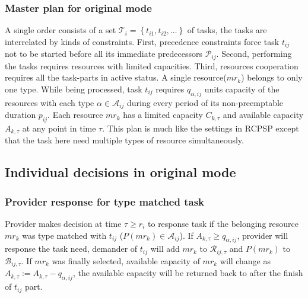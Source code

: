 \subsubsection{Master plan for original mode} %
\label{ssub:master_plam}
A single order consists of a set $\mathcal{T}_i = \left\{ t_{i1},t_{i2},\dots\right\}$ of tasks, the tasks are interrelated by kinds of constraints. First, precedence constraints force task $t_{ij}$ not to be started before all its immediate predecessors $\mathcal{P}_{ij}$. Second, performing the tasks requires resources with limited capacities. Third, resources cooperation requires all the task-parts in active status.
A single resource($mr_k$) belongs to only one type. While being processed, task $t_{ij}$ requires $q_{\alpha,ij}$ units capacity of the resources with each type $\alpha\in\mathcal{A}_{ij}$ during every period of its non-preemptable duration $p_{ij}$. Each resource $mr_k$ has a limited capacity $C_{k,\tau}$ and available capacity $A_{k,\tau}$ at any point in time $\tau$. This plan is much like the settings in RCPSP\cite{Kolisch1999} except that the task here need multiple types of resource simultaneously.

\subsection{Individual decisions in original mode} %
\label{sub:interactions_and_decisions}
\subsubsection{Provider response for type matched task}
\label{subs:Response_for_type_matched_task}
Provider makes decision at time $\tau\ge r_i$ to response task if the belonging resource $mr_k$ was type matched with $t_{ij}$ ($P(mr_k)\in\mathcal{A}_{ij}$). If $A_{k,\tau} \ge q_{\alpha,ij}$, provider will response the task need, demander of $t_{ij}$ will add $mr_k$ to $\mathcal{R}_{ij,\tau}$ and $P(mr_k)$ to $\mathcal{B}_{ij,\tau}$. If $mr_k$ was finally selected, available capacity of $mr_k$ will change as $A_{k,\tau} := A_{k,\tau} - q_{\alpha,ij}$, the available capacity will be returned back to after the finish of $t_{ij}$ part.

